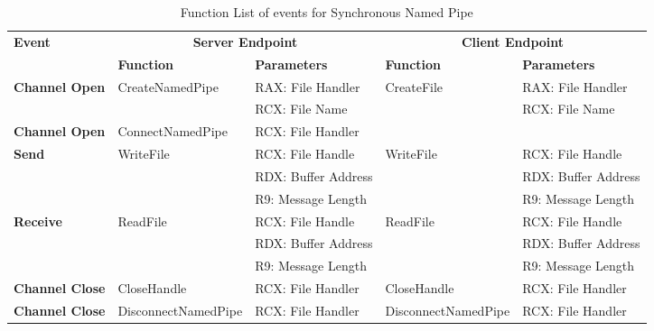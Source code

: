     \begin{table}[H]
        \centering
        \small
        \caption{Function List  of events for Synchronous Named Pipe}
        \label{synfunctions}
        \begin{tabular}{|l|l|l|l|l|}
            \hline
             \multirow{2}{*}{\textbf{Event}} &
               \multicolumn{2}{c|}{\textbf{Server Endpoint}} &
               \multicolumn{2}{c|}{\textbf{Client Endpoint}} \\
             \cline{2-5}
              & \textbf{Function}& \textbf{Parameters} & \textbf{Function} & \textbf{Parameters}  \\
             \hline
             \multirow{2}{*}{{\textbf{Channel Open}}}
             &\multirow{2}{*}{{CreateNamedPipe}} &  RAX: File Handler & \multirow{2}{*}{CreateFile} &  RAX: File Handler\\
              \cline{3-3} \cline{5-5}
             &&  RCX: File Name &  &  RCX: File Name\\
            \hline
             {{\textbf{Channel Open}}}
             &{ConnectNamedPipe} & {RCX: File Handler} & & \\
            \hline
             \multirow{3}{*}{{\textbf{Send}}}
             &\multirow{3}{*}{WriteFile} &  RCX: File Handle & \multirow{3}{*}{WriteFile} &  RCX: File Handle\\
              \cline{3-3} \cline{5-5}
             &&  RDX: Buffer Address &  &  RDX: Buffer Address\\
                           \cline{3-3} \cline{5-5}
             & &  R9: Message Length &  &  R9: Message Length\\
            \hline
             \multirow{3}{*}{{\textbf{Receive}}}
             & \multirow{3}{*}{ReadFile}&  RCX: File Handle & \multirow{3}{*}{ReadFile} &  RCX: File Handle\\
              \cline{3-3} \cline{5-5}
              &&  RDX: Buffer Address &  &  RDX: Buffer Address\\
                           \cline{3-3} \cline{5-5}
             & &  R9: Message Length &  &  R9: Message Length\\
            \hline
           {{\textbf{Channel Close}}}
             &{CloseHandle} & {RCX: File Handler} & {CloseHandle} & {RCX: File Handler}\\
            \hline
             {{\textbf{Channel Close}}}
             &{DisconnectNamedPipe} & {RCX: File Handler} & {DisconnectNamedPipe} & {RCX: File Handler}\\
            \hline
        \end{tabular}
    \end{table}

